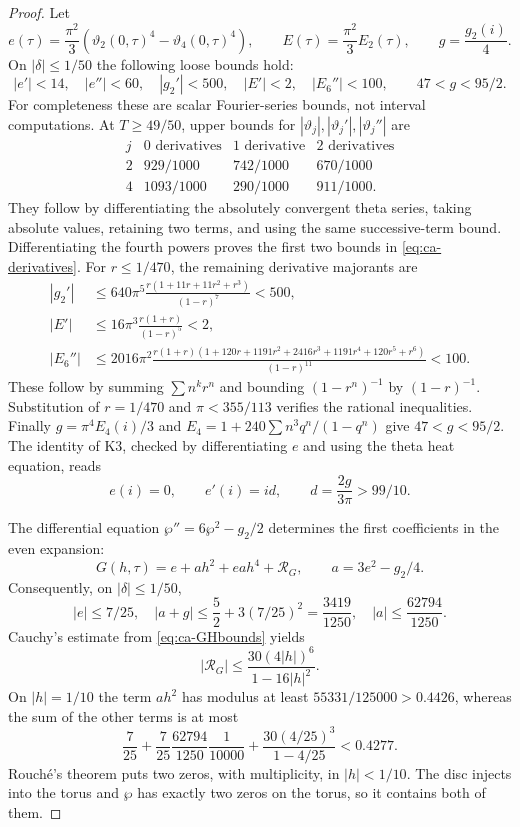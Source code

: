 \begin{proof}
Let
\[
 e(\tau)=\frac{\pi^2}{3}(\vartheta_2(0,\tau)^4-
                              \vartheta_4(0,\tau)^4),\qquad
 E(\tau)=\frac{\pi^2}{3}E_2(\tau),\qquad
 g=\frac{g_2(i)}4.
\]
On $|\delta|\le1/50$ the following loose bounds hold:
\begin{equation}\label{eq:ca-derivatives}
 |e'|<14,\quad |e''|<60,\quad |g_2'|<500,
 \quad |E'|<2,\quad |E_6''|<100,
 \qquad 47<g<95/2.
\end{equation}
For completeness these are scalar Fourier-series bounds, not
interval computations. At $T\ge49/50$, upper bounds for
$|\vartheta_j|,|\vartheta_j'|,|\vartheta_j''|$ are
\[
\begin{array}{c|ccc}
j&0\text{ derivatives}&1\text{ derivative}&2\text{ derivatives}\\ \hline
2&929/1000&742/1000&670/1000\\
4&1093/1000&290/1000&911/1000.
\end{array}
\]
They follow by differentiating the absolutely convergent theta
series, taking absolute values, retaining two terms, and using
the same successive-term bound. Differentiating the fourth
powers proves the first two bounds in \eqref{eq:ca-derivatives}.
For $r\le1/470$, the remaining derivative majorants are
\begin{align*}
 |g_2'|&\le640\pi^5\frac{r(1+11r+11r^2+r^3)}{(1-r)^7}<500,\\
 |E'|&\le16\pi^3\frac{r(1+r)}{(1-r)^5}<2,\\
 |E_6''|&\le2016\pi^2
 \frac{r(1+r)(1+120r+1191r^2+2416r^3+1191r^4+120r^5+r^6)}
 {(1-r)^{11}}<100.
\end{align*}
These follow by summing $\sum n^k r^n$ and bounding
$(1-r^n)^{-1}$ by $(1-r)^{-1}$. Substitution of $r=1/470$
and $\pi<355/113$ verifies the rational inequalities.
Finally $g=\pi^4E_4(i)/3$ and
$E_4=1+240\sum n^3q^n/(1-q^n)$ give $47<g<95/2$.
The identity of K3, checked by differentiating $e$ and using
the theta heat equation, reads
\[
 e(i)=0,\qquad e'(i)=id,\qquad d=\frac{2g}{3\pi}>99/10.
\]

The differential equation $\wp''=6\wp^2-g_2/2$ determines the
first coefficients in the even expansion:
\[
 G(h,\tau)=e+a h^2+ea h^4+\mathcal R_G,
 \qquad a=3e^2-g_2/4.
\]
Consequently, on $|\delta|\le1/50$,
\[
 |e|\le7/25,\quad |a+g|\le\frac52+3(7/25)^2=\frac{3419}{1250},
 \quad |a|\le\frac{62794}{1250}.
\]
Cauchy's estimate from \eqref{eq:ca-GHbounds} yields
\[
 |\mathcal R_G|\le
 \frac{30(4|h|)^6}{1-16|h|^2}.
\]
On $|h|=1/10$ the term $ah^2$ has modulus at least
$55331/125000>0.4426$, whereas the sum of the other terms is at most
\[
 \frac7{25}+\frac7{25}\frac{62794}{1250}\frac1{10000}
       +\frac{30(4/25)^3}{1-4/25}<0.4277.
\]
Rouch\'e's theorem puts two zeros, with multiplicity, in
$|h|<1/10$. The disc injects into the torus and $\wp$ has exactly
two zeros on the torus, so it contains both of them.


\end{proof}

